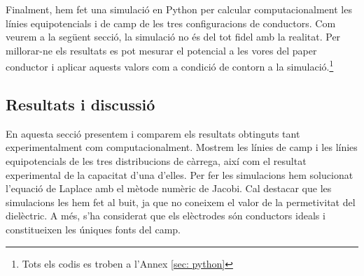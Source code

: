 \documentclass[11pt]{article}
\numberwithin{equation}{section}
\numberwithin{figure}{section}
\numberwithin{table}{section}
\begin{document}
Finalment, hem fet una simulació en Python per calcular computacionalment les línies equipotencials i de camp de les tres configuracions de conductors. Com veurem a la següent secció, la simulació no és del tot fidel amb la realitat. Per millorar-ne els resultats es pot mesurar el potencial a les vores del paper conductor i aplicar aquests valors com a condició de contorn a la simulació.\footnote{\label{nota: codis}Tots els codis es troben a l'Annex \ref{sec: python}}

\subsection{Resultats i discussió}\label{sec: resultats}
En aquesta secció presentem i comparem els resultats obtinguts tant experimentalment com computacionalment. Mostrem les línies de camp i les línies equipotencials de les tres distribucions de càrrega, així com el resultat experimental de la capacitat d'una d'elles. Per fer les simulacions hem solucionat l'equació de Laplace amb el mètode numèric de Jacobi\footnotemark[3]. Cal destacar que les simulacions les hem fet al buit, ja que no coneixem el valor de la permetivitat del dielèctric. A més, s'ha considerat que els elèctrodes són conductors ideals i constitueixen les úniques fonts del camp.
\end{document}
